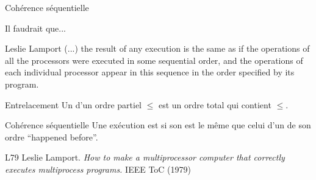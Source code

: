 
\begingroup

\begin{frame}[fragile]{Cohérence séquentielle}

  \begin{alertblock}{Il faudrait que...}
    \begin{shadequote}{Leslie Lamport}
      (...) the result of any execution is \alert{the same as} if the operations of all the processors were executed in some sequential order,
      and the operations of each individual processor appear in this sequence in the order specified by its program.
    \end{shadequote}
  \end{alertblock}

  \vfill

  \begin{block}{Entrelacement}
    Un  d'un ordre partiel $\le$ est un ordre total qui contient $\le$. 
  \end{block}
  \begin{block}{Cohérence séquentielle}
    Une exécution est  si son  est \alert{le même que} celui d'un  de son ordre ``happened before''.
  \end{block}

  \vfill
  \begin{citing}
  \item[L79] Leslie Lamport. \textit{How to make a multiprocessor computer that correctly executes multiprocess programs.} IEEE ToC (1979)
  \end{citing}

\end{frame}

\endgroup
\endinput
